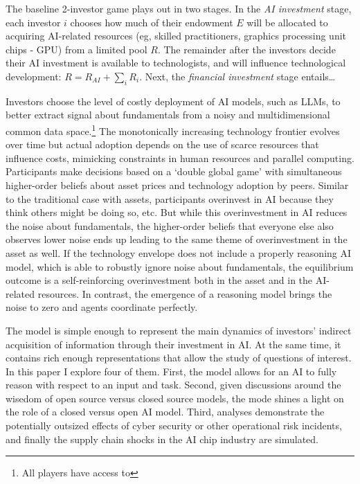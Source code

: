 \documentclass[
]{article}
\theoremstyle{plain}
\theoremstyle{remark}
\begin{document}
The baseline 2-investor game plays out in two stages. In the \emph{AI
investment} stage, each investor \(i\) chooses how much of their
endowment \(E\) will be allocated to acquiring AI-related resources (eg,
skilled practitioners, graphics processing unit chips - GPU) from a
limited pool \(R\). The remainder after the investors decide their AI
investment is available to technologists, and will influence
technological development: \(R = R_{AI} + \sum_i R_i\). Next, the
\emph{financial investment} stage entails\ldots{}

Investors choose the level of costly deployment of AI models, such as
LLMs, to better extract signal about fundamentals from a noisy and
multidimensional common data space.\footnote{All players have access to}
The monotonically increasing technology frontier evolves over time but
actual adoption depends on the use of scarce resources that influence
costs, mimicking constraints in human resources and parallel computing.
Participants make decisions based on a `double global game' with
simultaneous higher-order beliefs about asset prices and technology
adoption by peers. Similar to the traditional case with assets,
participants overinvest in AI because they think others might be doing
so, etc. But while this overinvestment in AI reduces the noise about
fundamentals, the higher-order beliefs that everyone else also observes
lower noise ends up leading to the same theme of overinvestment in the
asset as well. If the technology envelope does not include a properly
reasoning AI model, which is able to robustly ignore noise about
fundamentals, the equilibrium outcome is a self-reinforcing
overinvestment both in the asset and in the AI-related resources. In
contrast, the emergence of a reasoning model brings the noise to zero
and agents coordinate perfectly.

The model is simple enough to represent the main dynamics of investors'
indirect acquisition of information through their investment in AI. At
the same time, it contains rich enough representations that allow the
study of questions of interest. In this paper I explore four of them.
First, the model allows for an AI to fully reason with respect to an
input and task. Second, given discussions around the wisedom of open
source versus closed source models, the mode shines a light on the role
of a closed versus open AI model. Third, analyses demonstrate the
potentially outsized effects of cyber security or other operational risk
incidents, and finally the supply chain shocks in the AI chip industry
are simulated.
\end{document}
